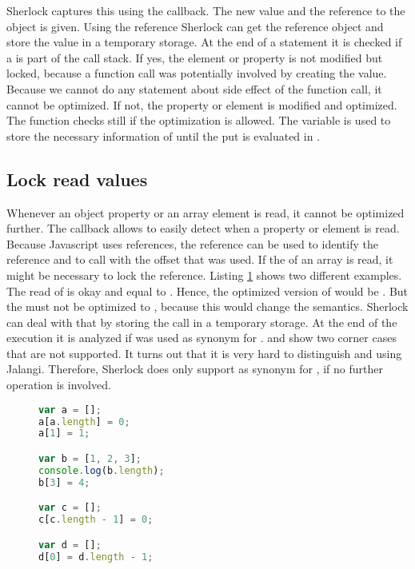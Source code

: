 Sherlock captures this using the  callback. The new value and the reference to the object is given. Using the reference Sherlock can get the reference object and store the value in a temporary storage. At the end of a statement it is checked if a  is part of the call stack. If yes, the element or property is not modified but locked, because a function call was potentially involved by creating the value. Because we cannot do any statement about side effect of the function call, it cannot be optimized. If not, the property or element is modified and optimized. The  function checks still if the optimization is allowed. The variable  is used to store the necessary information of  until the put is evaluated in .


\subsection{Lock read values}
Whenever an object property or an array element is read, it cannot be optimized further. The callback  allows to easily detect when a property or element is read. Because Javascript uses references, the reference can be used to identify the reference and to call  with the offset that was used. If the  of an array is read, it might be necessary to lock the reference. Listing \ref{fig:array_length} shows two different examples. The read of  is okay and equal to . Hence, the optimized version of  would be \js{[0, 1]}. But the  must not be optimized to \js{[1, 2, 3, 4]}, because this would change the semantics. Sherlock can deal with that by storing the  call in a temporary storage. At the end of the execution it is analyzed if  was used as synonym for .  and  show two corner cases that are not supported. It turns out that it is very hard to distinguish  and  using Jalangi. Therefore, Sherlock does only support  as synonym for , if no further  operation is involved.

\begin{figure}[htbp]
\begin{lstlisting}[language=Javascript]
var a = [];
a[a.length] = 0;
a[1] = 1;

var b = [1, 2, 3];
console.log(b.length);
b[3] = 4;

var c = [];
c[c.length - 1] = 0;

var d = [];
d[0] = d.length - 1;
\end{lstlisting}
\caption{}\label{fig:array_length}
\end{figure}


